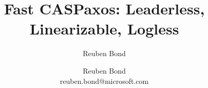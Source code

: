 \documentclass[conference, 10pt]{IEEEtran}
\begin{document}


\title{Fast CASPaxos: Leaderless, Linearizable, Logless}

\ifIEEE
    \author{
    }
\fi

\ifACM
    \author{Reuben Bond}
\fi

\ifUSENIX
    \date{} %
    \author{
      {\rm Reuben Bond}\\
      reuben.bond@microsoft.com
    }
\fi

\ifACM
    
    \maketitle
    \pagestyle{plain} %
\else
    \maketitle
    
\fi








\ifIEEE
    
\fi

\ifACM
    
\fi

\ifUSENIX
    
\fi



\appendix


\end{document}
